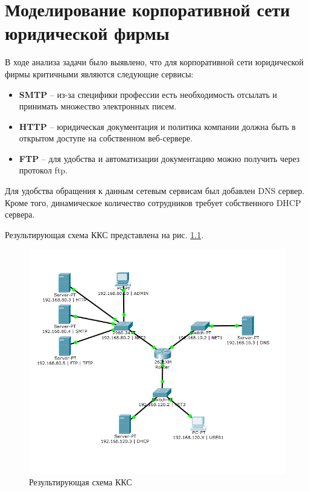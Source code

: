\chapter{Моделирование корпоративной сети юридической фирмы}

В ходе анализа задачи было выявлено, что для корпоративной сети юридической фирмы критичными являются следующие сервисы:

\begin{itemize}
	\item \textbf{SMTP} -- из-за специфики профессии есть необходимость отсылать и принимать множество электронных писем.
	\item \textbf{HTTP} -- юридическая документация и политика компании должна быть в открытом доступе на собственном веб-сервере.
	\item \textbf{FTP} -- для удобства и автоматизации документацию можно получить через протокол ftp.
\end{itemize}

Для удобства обращения к данным сетевым сервисам был добавлен DNS сервер. Кроме того, динамическое количество сотрудников требует собственного DHCP сервера.

Результирующая схема ККС представлена на рис. \ref{image:0}.

\begin{figure}[h!]
	\centering
	\includegraphics[scale = 0.58]{images/0.png}
	\caption{Результирующая схема ККС}
	\label{image:0}
\end{figure}

